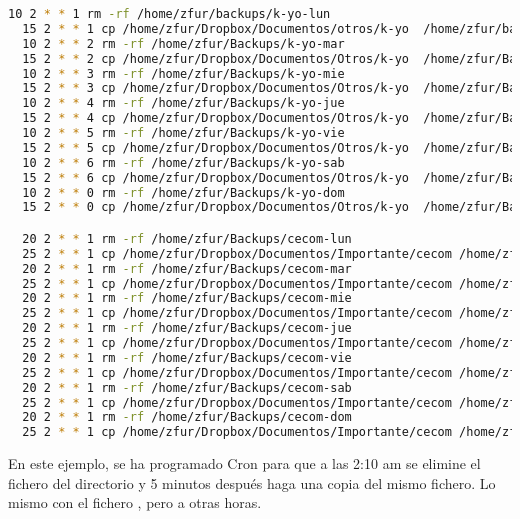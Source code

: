 \begin{lstlisting}[gobble=2,language=bash,style=bashinteract,escapechar=!]
  10 2 * * 1 rm -rf /home/zfur/backups/k-yo-lun
  15 2 * * 1 cp /home/zfur/Dropbox/Documentos/otros/k-yo  /home/zfur/backups/k-yo-lun
  10 2 * * 2 rm -rf /home/zfur/Backups/k-yo-mar
  15 2 * * 2 cp /home/zfur/Dropbox/Documentos/Otros/k-yo  /home/zfur/Backups/k-yo-mar
  10 2 * * 3 rm -rf /home/zfur/Backups/k-yo-mie
  15 2 * * 3 cp /home/zfur/Dropbox/Documentos/Otros/k-yo  /home/zfur/Backups/k-yo-mie
  10 2 * * 4 rm -rf /home/zfur/Backups/k-yo-jue
  15 2 * * 4 cp /home/zfur/Dropbox/Documentos/Otros/k-yo  /home/zfur/Backups/k-yo-jue
  10 2 * * 5 rm -rf /home/zfur/Backups/k-yo-vie
  15 2 * * 5 cp /home/zfur/Dropbox/Documentos/Otros/k-yo  /home/zfur/Backups/k-yo-vie
  10 2 * * 6 rm -rf /home/zfur/Backups/k-yo-sab
  15 2 * * 6 cp /home/zfur/Dropbox/Documentos/Otros/k-yo  /home/zfur/Backups/k-yo-sab
  10 2 * * 0 rm -rf /home/zfur/Backups/k-yo-dom
  15 2 * * 0 cp /home/zfur/Dropbox/Documentos/Otros/k-yo  /home/zfur/Backups/k-yo-dom

  20 2 * * 1 rm -rf /home/zfur/Backups/cecom-lun
  25 2 * * 1 cp /home/zfur/Dropbox/Documentos/Importante/cecom /home/zfur/Backups/cecom-lun
  20 2 * * 1 rm -rf /home/zfur/Backups/cecom-mar
  25 2 * * 1 cp /home/zfur/Dropbox/Documentos/Importante/cecom /home/zfur/Backups/cecom-mar
  20 2 * * 1 rm -rf /home/zfur/Backups/cecom-mie
  25 2 * * 1 cp /home/zfur/Dropbox/Documentos/Importante/cecom /home/zfur/Backups/cecom-mie
  20 2 * * 1 rm -rf /home/zfur/Backups/cecom-jue
  25 2 * * 1 cp /home/zfur/Dropbox/Documentos/Importante/cecom /home/zfur/Backups/cecom-jue
  20 2 * * 1 rm -rf /home/zfur/Backups/cecom-vie
  25 2 * * 1 cp /home/zfur/Dropbox/Documentos/Importante/cecom /home/zfur/Backups/cecom-vie
  20 2 * * 1 rm -rf /home/zfur/Backups/cecom-sab
  25 2 * * 1 cp /home/zfur/Dropbox/Documentos/Importante/cecom /home/zfur/Backups/cecom-sab
  20 2 * * 1 rm -rf /home/zfur/Backups/cecom-dom
  25 2 * * 1 cp /home/zfur/Dropbox/Documentos/Importante/cecom /home/zfur/Backups/cecom-dom
\end{lstlisting}

\noindent En este ejemplo, se ha programado Cron para que a las 2:10 am se elimine el fichero
 del directorio  y 5 minutos después haga una copia del mismo
fichero. Lo mismo con el fichero , pero a otras horas.
